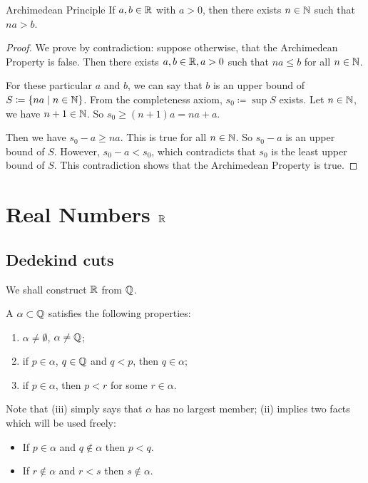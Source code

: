\begin{theorem}{Archimedean Principle}{}
If $a,b \in \mathbb R$ with $a>0$, then there exists $n \in \mathbb N$ such that $na>b$.
\end{theorem}
\begin{proof}
We prove by contradiction: suppose otherwise, that the Archimedean Property is false. Then there exists $a, b \in \mathbb R, a > 0$ such that $na \le b$ for all $n \in \mathbb N$.

For these particular $a$ and $b$, we can say that $b$ is an upper bound of $S \coloneqq \{na \mid n \in \mathbb N\}$. From the completeness axiom, $s_0 \coloneqq \sup S$ exists. Let $n \in \mathbb N$, we have $n+1 \in \mathbb N$. So $s_0 \ge (n+1)a = na+a$.

Then we have $s_0-a \ge na$. This is true for all $n \in \mathbb N$. So $s_0-a$ is an upper bound of $S$. However, $s_0-a<s_0$, which contradicts that $s_0$ is the least upper bound of $S$. This contradiction shows that the Archimedean Property is true.
\end{proof}
\pagebreak



\section{Real Numbers $\mathbb R$}
\subsection{Dedekind cuts}
We shall construct $\mathbb R$ from $\mathbb Q$.

\begin{definition}
A  $\alpha\subset\mathbb Q$ satisfies the following properties:
\begin{enumerate}[label=(\roman*)]
\item $\alpha\neq\emptyset$, $\alpha\neq\mathbb Q$;
\item if $p\in\alpha$, $q\in\mathbb Q$ and $q<p$, then $q\in\alpha$;
\item if $p\in\alpha$, then $p<r$ for some $r\in\alpha$.
\end{enumerate}
\end{definition}

Note that (iii) simply says that $\alpha$ has no largest member; (ii) implies two facts which will be used freely:
\begin{itemize}
\item If $p\in\alpha$ and $q\notin\alpha$ then $p<q$.
\item If $r\notin\alpha$ and $r<s$ then $s\notin\alpha$.
\end{itemize}

